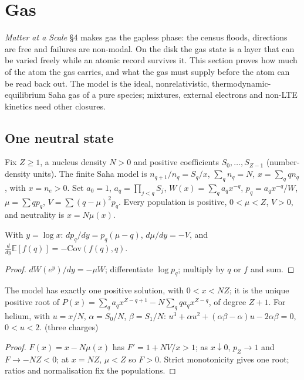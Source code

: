 \section{Gas}\label{sec:gas}
\emph{Matter at a Scale} §4 makes gas the gapless phase: the census floods, directions are free and failures are non-modal. On the disk the gas state is a layer that can be varied freely while an atomic record survives it. This section proves how much of the atom the gas carries, and what the gas must supply before the atom can be read back out. The model is the ideal, nonrelativistic, thermodynamic-equilibrium Saha gas of a pure species; mixtures, external electrons and non-LTE kinetics need other closures.

\subsection{One neutral state}
Fix $Z\ge1$, a nucleus density $N>0$ and positive coefficients $S_0,\dots,S_{Z-1}$ (number-density units). The finite Saha model is $n_{q+1}/n_q=S_q/x$, $\sum_qn_q=N$, $x=\sum_qqn_q$, with $x=n_e>0$. Set $a_0=1$, $a_q=\prod_{j<q}S_j$, $W(x)=\sum_qa_qx^{-q}$, $p_q=a_qx^{-q}/W$, $\mu=\sum qp_q$, $V=\sum(q-\mu)^2p_q$. Every population is positive, $0<\mu<Z$, $V>0$, and neutrality is $x=N\mu(x)$.

\begin{lemma}\label{lem:expfam}
With $y=\log x$: $dp_q/dy=p_q(\mu-q)$, $d\mu/dy=-V$, and $\frac{d}{dy}\mathbb E[f(q)]=-\mathrm{Cov}(f(q),q)$. 
\end{lemma}
\begin{proof}
$dW(e^y)/dy=-\mu W$; differentiate $\log p_q$; multiply by $q$ or $f$ and sum.
\end{proof}

\begin{theorem}\label{thm:saha}
The model has exactly one positive solution, with $0<x<NZ$; it is the unique positive root of $P(x)=\sum_qa_qx^{Z-q+1}-N\sum_qqa_qx^{Z-q}$, of degree $Z+1$. For helium, with $u=x/N$, $\alpha=S_0/N$, $\beta=S_1/N$: $u^3+\alpha u^2+(\alpha\beta-\alpha)u-2\alpha\beta=0$, $0<u<2$. (three charges)
\end{theorem}
\begin{proof}
$F(x)=x-N\mu(x)$ has $F'=1+NV/x>1$; as $x\downarrow0$, $p_Z\to1$ and $F\to-NZ<0$; at $x=NZ$, $\mu<Z$ so $F>0$. Strict monotonicity gives one root; ratios and normalisation fix the populations.
\end{proof}

